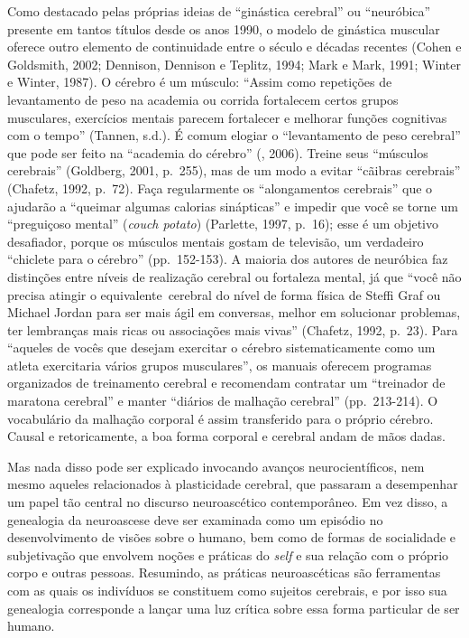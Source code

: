 Como destacado pelas próprias ideias de ``ginástica cerebral'' ou
``neuróbica'' presente em tantos títulos desde os anos 1990, o modelo de
ginástica muscular oferece outro elemento de continuidade entre o século
 e décadas recentes (Cohen e Goldsmith, 2002; Dennison, Dennison e
Teplitz, 1994; Mark e Mark, 1991; Winter e Winter, 1987). O cérebro é um
músculo: ``Assim como repetições de levantamento de peso na academia ou
corrida fortalecem certos grupos musculares, exercícios mentais parecem
fortalecer e melhorar funções cognitivas com o tempo'' (Tannen, s.d.). É
comum elogiar o ``levantamento de peso cerebral'' que pode ser feito na
``academia do cérebro'' (, 2006). Treine seus ``músculos cerebrais''
(Goldberg, 2001, p.~255), mas de um modo a evitar ``cãibras cerebrais''
(Chafetz, 1992, p.~72). Faça regularmente os ``alongamentos cerebrais''
que o ajudarão a ``queimar algumas calorias sinápticas'' e impedir que
você se torne um ``preguiçoso mental'' (\emph{couch potato}) (Parlette,
1997, p.~16); esse é um objetivo desafiador, porque os músculos mentais
gostam de televisão, um verdadeiro ``chiclete para o cérebro''
(pp.~152-153). A maioria dos autores de neuróbica faz distinções entre
níveis de realização cerebral ou fortaleza mental, já que ``você não
precisa atingir o equivalente~cerebral do nível de forma física de
Steffi Graf ou Michael Jordan para ser mais ágil em conversas, melhor em
solucionar problemas, ter lembranças mais ricas ou associações mais
vivas'' (Chafetz, 1992, p.~23). Para ``aqueles de vocês que desejam
exercitar o cérebro sistematicamente como um atleta exercitaria vários
grupos musculares'', os manuais oferecem programas organizados de
treinamento cerebral e recomendam contratar um ``treinador de maratona
cerebral'' e manter ``diários de malhação cerebral'' (pp.~213-214). O
vocabulário da malhação corporal é assim transferido para o próprio
cérebro. Causal e retoricamente, a boa forma corporal e cerebral andam
de mãos dadas.

Mas nada disso pode ser explicado invocando avanços neurocientíficos,
nem mesmo aqueles relacionados à plasticidade cerebral, que passaram a
desempenhar um papel tão central no discurso neuroascético
contemporâneo. Em vez disso, a genealogia da neuroascese deve ser
examinada como um episódio no desenvolvimento de visões sobre o humano,
bem como de formas de socialidade e subjetivação que envolvem noções e
práticas do \emph{self} e sua relação com o próprio corpo e outras pessoas.
Resumindo, as práticas neuroascéticas são ferramentas com as quais os
indivíduos se constituem como sujeitos cerebrais, e por isso sua
genealogia corresponde a lançar uma luz crítica sobre essa forma
particular de ser humano.

